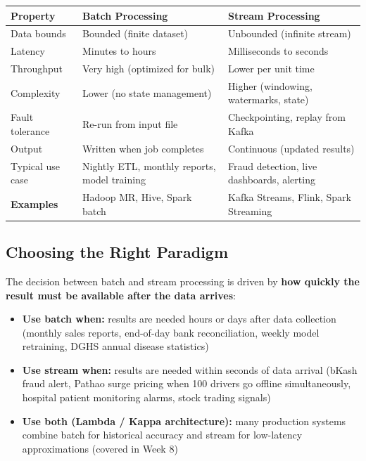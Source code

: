 \documentclass[12pt,a4paper]{article}
\begin{document}
\begin{center}
\renewcommand{\arraystretch}{1.5}
\begin{tabular}{p{3.5cm}p{4.5cm}p{4.5cm}}
  \toprule
  \textbf{Property} & \textbf{Batch Processing} & \textbf{Stream Processing} \\
  \midrule
  Data bounds & Bounded (finite dataset) & Unbounded (infinite stream) \\
  Latency & Minutes to hours & Milliseconds to seconds \\
  Throughput & Very high (optimized for bulk) & Lower per unit time \\
  Complexity & Lower (no state management) & Higher (windowing, watermarks, state) \\
  Fault tolerance & Re-run from input file & Checkpointing, replay from Kafka \\
  Output & Written when job completes & Continuous (updated results) \\
  Typical use case & Nightly ETL, monthly reports, model training & Fraud detection, live dashboards, alerting \\
  \textbf{Examples} & Hadoop MR, Hive, Spark batch & Kafka Streams, Flink, Spark Streaming \\
  \bottomrule
\end{tabular}
\end{center}

\subsection{Choosing the Right Paradigm}

The decision between batch and stream processing is driven by \textbf{how quickly the result must be available after the data arrives}:

\begin{itemize}[leftmargin=1.8em]
  \item \textbf{Use batch when:} results are needed hours or days after data collection (monthly sales reports, end-of-day bank reconciliation, weekly model retraining, DGHS annual disease statistics)
  \item \textbf{Use stream when:} results are needed within seconds of data arrival (bKash fraud alert, Pathao surge pricing when 100 drivers go offline simultaneously, hospital patient monitoring alarms, stock trading signals)
  \item \textbf{Use both (Lambda / Kappa architecture):} many production systems combine batch for historical accuracy and stream for low-latency approximations (covered in Week 8)
\end{itemize}
\end{document}
